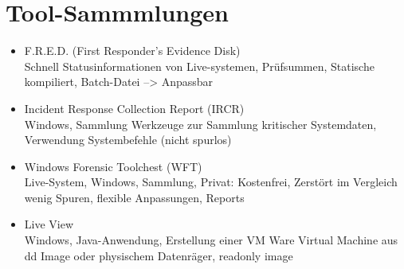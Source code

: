 \section{Tool-Sammmlungen}
\begin{itemize}
\item F.R.E.D. (First Responder's Evidence Disk)\\
Schnell Statusinformationen von Live-systemen, Prüfsummen, Statische kompiliert, Batch-Datei --> Anpassbar
\item Incident Response Collection Report (IRCR)\\
Windows, Sammlung Werkzeuge zur Sammlung kritischer Systemdaten, Verwendung Systembefehle (nicht spurlos)
\item Windows Forensic Toolchest (WFT)\\
Live-System, Windows, Sammlung, Privat: Kostenfrei, Zerstört im Vergleich wenig Spuren, flexible Anpassungen, Reports
\item Live View\\
Windows, Java-Anwendung, Erstellung einer VM Ware Virtual Machine aus dd Image oder physischem Datenräger, readonly image
\end{itemize}

